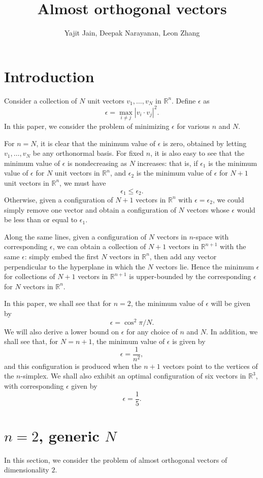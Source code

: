 \documentclass[11pt,letterpaper,twoside,english]{article}
\title{Almost orthogonal vectors}
\author{Yajit Jain, Deepak Narayanan, Leon Zhang}
\theoremstyle{theorem}
\theoremstyle{remark}
\begin{document}
\maketitle

\section{Introduction}
Consider a collection of $N$ unit vectors $v_1, \ldots, v_N$ in $\mathbb R^n$. Define $\epsilon$ as
\[\epsilon=\max_{i\neq j}|v_i\cdot v_j|^2.\]
In this paper, we consider the problem of minimizing $\epsilon$ for various $n$ and $N$.

For $n=N$, it is clear that the minimum value of $\epsilon$ is zero, obtained by letting $v_1,\ldots, v_N$ be any orthonormal basis. For fixed $n$, it is also easy to see that the minimum value of $\epsilon$ is nondecreasing as $N$ increases: that is, if $\epsilon_1$ is the minimum value of $\epsilon$ for $N$ unit vectors in $\mathbb R^n$, and $\epsilon_2$ is the minimum value of $\epsilon$ for $N+1$ unit vectors in $\mathbb R^n$, we must have 
\[\epsilon_1\leq \epsilon_2.\] 
Otherwise, given a configuration of $N+1$ vectors in $\mathbb R^n$ with $\epsilon=\epsilon_2$, we could simply remove one vector and obtain a configuration of $N$ vectors whose $\epsilon$ would be less than or equal to $\epsilon_1$.

Along the same lines, given a configuration of $N$ vectors in $n$-space with corresponding $\epsilon$, we can obtain a collection of $N+1$ vectors in $\mathbb R^{n+1}$ with the same $\epsilon$: simply embed the first $N$ vectors in $\mathbb R^{n}$, then add any vector perpendicular to the hyperplane in which the $N$ vectors lie. Hence the minimum $\epsilon$ for collections of $N+1$ vectors in $\mathbb R^{n+1}$ is upper-bounded by the corresponding $\epsilon$ for $N$ vectors in $\mathbb R^n$.

In this paper, we shall see that for $n=2$, the minimum value of $\epsilon$ will be given by 
\[\epsilon=\cos^2\pi/N.\] 
We will also derive a lower bound on $\epsilon$ for any choice of $n$ and $N$. In addition, we shall see that, for $N=n+1$, the minimum value of $\epsilon$ is given by
\[\epsilon=\frac{1}{n^2},\] 
and this configuration is produced when the $n+1$ vectors point to the vertices of the $n$-simplex. We shall also exhibit an optimal configuration of six vectors in $\mathbb R^3$, with corresponding $\epsilon$ given by
\[\epsilon=\frac 1 5.\]

\section{$n=2$, generic $N$}
In this section, we consider the problem of almost orthogonal vectors of dimensionality $2$.
\end{document}
